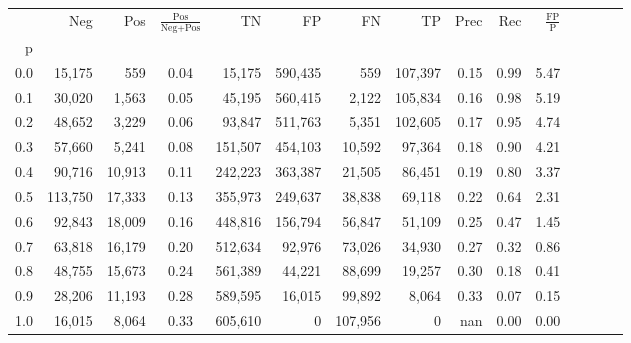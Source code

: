 \begin{tabular}{rrrcrrrrrrrrrrr}
\toprule
{} &      Neg &     Pos & $\frac{\text{Pos}}{\text{Neg}+\text{Pos}}$ &       TN &       FP &       FN &       TP &  Prec &   Rec & $\frac{\text{FP}}{\text{P}}$ \\
p   &          &         &                                            &          &          &          &          &       &       &                              \\
\midrule
0.0 &   15,175 &     559 &                                       0.04 &   15,175 &  590,435 &      559 &  107,397 &  0.15 &  0.99 &                         5.47 \\
0.1 &   30,020 &   1,563 &                                       0.05 &   45,195 &  560,415 &    2,122 &  105,834 &  0.16 &  0.98 &                         5.19 \\
0.2 &   48,652 &   3,229 &                                       0.06 &   93,847 &  511,763 &    5,351 &  102,605 &  0.17 &  0.95 &                         4.74 \\
0.3 &   57,660 &   5,241 &                                       0.08 &  151,507 &  454,103 &   10,592 &   97,364 &  0.18 &  0.90 &                         4.21 \\
0.4 &   90,716 &  10,913 &                                       0.11 &  242,223 &  363,387 &   21,505 &   86,451 &  0.19 &  0.80 &                         3.37 \\
0.5 &  113,750 &  17,333 &                                       0.13 &  355,973 &  249,637 &   38,838 &   69,118 &  0.22 &  0.64 &                         2.31 \\
0.6 &   92,843 &  18,009 &                                       0.16 &  448,816 &  156,794 &   56,847 &   51,109 &  0.25 &  0.47 &                         1.45 \\
0.7 &   63,818 &  16,179 &                                       0.20 &  512,634 &   92,976 &   73,026 &   34,930 &  0.27 &  0.32 &                         0.86 \\
0.8 &   48,755 &  15,673 &                                       0.24 &  561,389 &   44,221 &   88,699 &   19,257 &  0.30 &  0.18 &                         0.41 \\
0.9 &   28,206 &  11,193 &                                       0.28 &  589,595 &   16,015 &   99,892 &    8,064 &  0.33 &  0.07 &                         0.15 \\
1.0 &   16,015 &   8,064 &                                       0.33 &  605,610 &        0 &  107,956 &        0 &   nan &  0.00 &                         0.00 \\
\bottomrule
\end{tabular}
